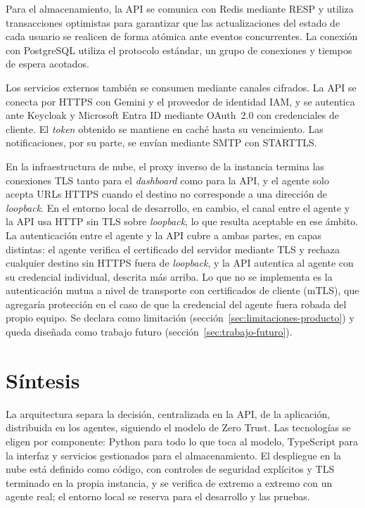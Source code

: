 Para el almacenamiento, la API se comunica con Redis mediante RESP y utiliza transacciones optimistas para garantizar que las actualizaciones del estado de cada usuario se realicen de forma atómica ante eventos concurrentes. La conexión con PostgreSQL utiliza el protocolo estándar, un grupo de conexiones y tiempos de espera acotados.

Los servicios externos también se consumen mediante canales cifrados. La API se conecta por HTTPS con Gemini y el proveedor de identidad IAM, y se autentica ante Keycloak y Microsoft Entra ID mediante OAuth~2.0 con credenciales de cliente. El \emph{token} obtenido se mantiene en caché hasta su vencimiento. Las notificaciones, por su parte, se envían mediante SMTP con STARTTLS.

En la infraestructura de nube, el proxy inverso de la instancia termina las conexiones TLS tanto para el \emph{dashboard} como para la API, y el agente solo acepta URLs HTTPS cuando el destino no corresponde a una dirección de \emph{loopback}. En el entorno local de desarrollo, en cambio, el canal entre el agente y la API usa HTTP sin TLS sobre \emph{loopback}, lo que resulta aceptable en ese ámbito. La autenticación entre el agente y la API cubre a ambas partes, en capas distintas: el agente verifica el certificado del servidor mediante TLS y rechaza cualquier destino sin HTTPS fuera de \emph{loopback}, y la API autentica al agente con su credencial individual, descrita más arriba. Lo que no se implementa es la autenticación mutua a nivel de transporte con certificados de cliente (mTLS), que agregaría protección en el caso de que la credencial del agente fuera robada del propio equipo. Se declara como limitación (sección~\ref{sec:limitaciones-producto}) y queda diseñada como trabajo futuro (sección~\ref{sec:trabajo-futuro}).

\section{Síntesis}
\label{sec:sintesis-arquitectura}
La arquitectura separa la decisión, centralizada en la API, de la aplicación, distribuida en los agentes, siguiendo el modelo de Zero Trust. Las tecnologías se eligen por componente: Python para todo lo que toca al modelo, TypeScript para la interfaz y servicios gestionados para el almacenamiento. El despliegue en la nube está definido como código, con controles de seguridad explícitos y TLS terminado en la propia instancia, y se verifica de extremo a extremo con un agente real; el entorno local se reserva para el desarrollo y las pruebas.

